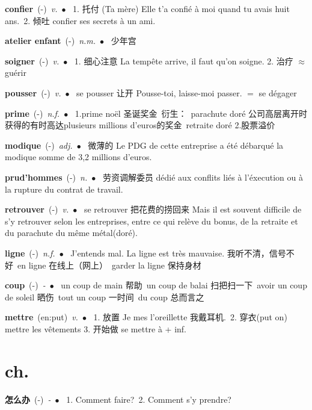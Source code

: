 \documentclass[10pt,a4paper,twoside]{article} %
\newcommand{\entry}[4]{\textbf{#1}\ {(#2)}\ \textit{#3}\ $\bullet$\ {#4}} %
\begin{document}
\begin{CJK*}{UTF8}{gkai}
\begin{multicols}{2}
\entry{confier}{-}{v.}
{
1. 托付 (Ta mère) Elle t'a confié à moi quand tu avais huit ans.\ 
2. 倾吐 confier ses secrets à un ami.
}

\entry{atelier enfant}{-}{n.m.}
{
少年宫
}

\entry{soigner}{-}{v.}
{
1. 细心注意 La tempête arrive, il faut qu'on soigne.
2. 治疗 $\approx$ guérir
}

\entry{pousser}{-}{v.}
{
se pousser 让开 Pousse-toi, laisse-moi passer. $=$ se dégager
}

\entry{prime}{-}{n.f.}
{
1.prime noël 圣诞奖金\ 
衍生：\ 
parachute doré 公司高层离开时获得的有时高达plusieurs millions d'euros的奖金\ 
retraite doré
2.股票溢价
}

\entry{modique}{-}{adj.}
{
微薄的 Le PDG de cette entreprise a été débarqué la modique somme de 3,2 millions d'euros.
}

\entry{prud'hommes}{-}{n.}
{
劳资调解委员 dédié aux conflits liés à l'éxecution ou à la rupture du contrat de travail.
}

\entry{retrouver}{-}{v.}
{
se retrouver 把花费的捞回来 Mais il est souvent difficile de s'y retrouver selon les entreprises, entre 
ce qui relève du bonus, de la retraite et du parachute du même métal(doré).
}

\entry{ligne}{-}{n.f.}
{
J'entends mal. La ligne est très mauvaise. 我听不清，信号不好\ 
en ligne 在线上（网上）\ garder la ligne 保持身材
}

\entry{coup}{-}{-}
{
un coup de main 帮助\ un coup de balai 扫把扫一下\ avoir un coup de soleil 晒伤\ 
tout un coup 一时间\ du coup 总而言之\ 
}

\entry{mettre}{en:put}{v.}
{
1. 放置 Je mes l'oreillette 我戴耳机.\ 
2. 穿衣(put on) mettre les vêtements
3. 开始做 se mettre à + inf.
}

\end{multicols}


\section*{ch.}

\begin{multicols}{2}

\entry{怎么办}{-}{-}
{
1. Comment faire?\ 
2. Comment s'y prendre?\ 
}


\end{multicols}
\end{CJK*}
\end{document}
